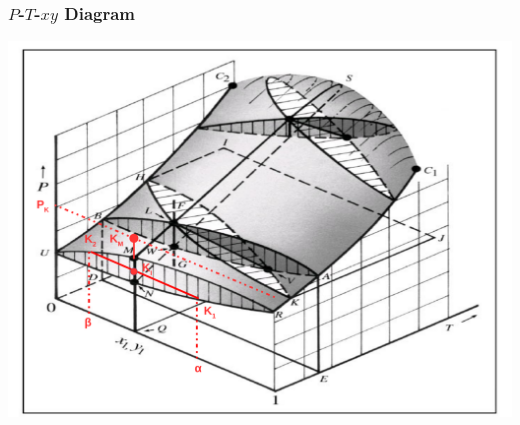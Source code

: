 \documentclass[10pt,compress,unknownkeysallowed]{beamer}
\begin{document}
\begin{frame}
  \frametitle{$P$-$T$-$xy$ Diagram}
     \begin{center}
       \includegraphics[width=.75\columnwidth,clip]{./../Pics/PTxy_Digram} %
     \end{center}
\end{frame}
\normalsize
\end{document}
